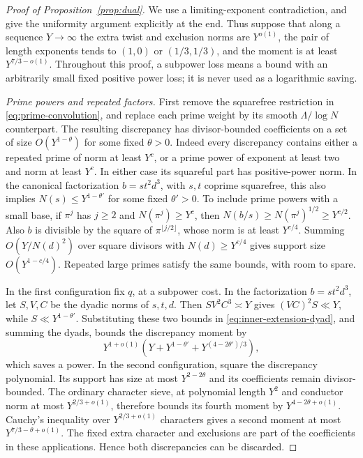\begin{proof}[Proof of Proposition~\ref{prop:dual}]
We use a limiting-exponent contradiction, and give the uniformity
argument explicitly at the end.  Thus suppose that along a sequence
$Y\to\infty$ the extra twist and exclusion norms are $Y^{o(1)}$,
the pair of length exponents tends to $(1,0)$ or $(1/3,1/3)$, and
the moment is at least $Y^{7/3-o(1)}$.  Throughout this proof, a
subpower loss means a bound with an arbitrarily small fixed positive
power loss; it is never used as a logarithmic saving.

\smallskip
\noindent\emph{Prime powers and repeated factors.}
First remove the squarefree restriction in
\eqref{eq:prime-convolution}, and replace each prime weight by its
smooth $\Lambda/\log N$ counterpart.  The resulting discrepancy has
divisor-bounded coefficients on a set of size $O(Y^{1-\theta})$ for
some fixed $\theta>0$.  Indeed every discrepancy contains either a
repeated prime of norm at least $Y^c$, or a prime power of exponent
at least two and norm at least $Y^c$.  In either case its squareful
part has positive-power norm.  In the canonical factorization
$b=st^2d^3$, with $s,t$ coprime squarefree, this also implies
$N(s)\le Y^{1-\theta'}$ for some fixed $\theta'>0$.
To include prime powers with a small base, if $\pi^j$ has $j\ge2$
and $N(\pi^j)\ge Y^c$, then
$N(b/s)\ge N(\pi^j)^{1/2}\ge Y^{c/2}$.
Also $b$ is divisible by the square of
$\pi^{\lfloor j/2\rfloor}$, whose norm is at least $Y^{c/4}$.
Summing $O(Y/N(d)^2)$ over square divisors with $N(d)\ge Y^{c/4}$
gives support size $O(Y^{1-c/4})$. Repeated large primes satisfy the
same bounds, with room to spare.

In the first configuration fix $q$, at a subpower cost. In the
factorization $b=st^2d^3$, let $S,V,C$ be the dyadic norms of $s,t,d$.
Then $SV^2C^3\asymp Y$ gives $(VC)^2S\ll Y$, while
$S\ll Y^{1-\theta'}$. Substituting these
two bounds in \eqref{eq:inner-extension-dyad}, and summing the dyads,
bounds the discrepancy moment by
\[
 Y^{1+o(1)}
 \left(Y+Y^{1-\theta'}+Y^{(4-2\theta')/3}\right),
\]
which saves a power.  In the second configuration, square the
discrepancy polynomial.  Its support has size at most
$Y^{2-2\theta}$ and its coefficients remain divisor-bounded.
The ordinary character sieve, at polynomial length $Y^2$ and
conductor norm at most $Y^{2/3+o(1)}$, therefore bounds its fourth
moment by $Y^{4-2\theta+o(1)}$.  Cauchy's inequality over
$Y^{2/3+o(1)}$ characters gives a second moment at most
$Y^{7/3-\theta+o(1)}$.  The fixed extra character and exclusions are
part of the coefficients in these applications.  Hence both
discrepancies can be discarded.


\end{proof}
